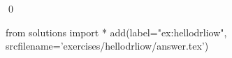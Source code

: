 
\begin{ex} 
  \label{ex:hellodrliow}
  
  \qed
\end{ex} 
\begin{python0}
from solutions import *
add(label="ex:hellodrliow",
    srcfilename='exercises/hellodrliow/answer.tex') 
\end{python0}
